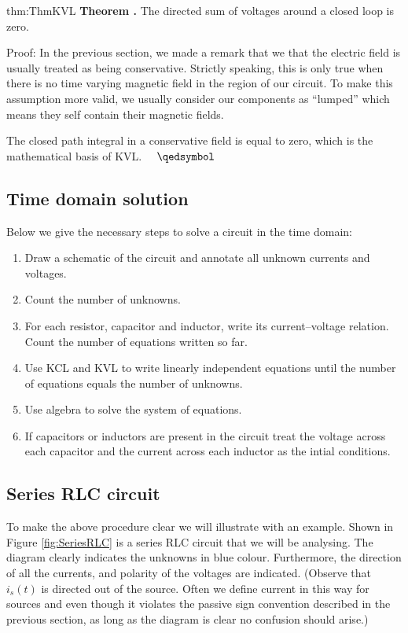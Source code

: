 \documentclass[14pt,a5paper,twoside]{book}
\newenvironment{myTheorem}[2]{ \begin{Theorem}[adjusted title=#1]{}{#2} 
  \textbf{Theorem \thetcbcounter.} \label{#2}}{\end{Theorem}}
\begin{document}
 
\begin{myTheorem}{Kirchhoff's Voltage Law (KVL)}{thm:ThmKVL}
	The directed sum of voltages around a closed loop is zero.
\end{myTheorem}
Proof: In the previous section, we made a remark that we that the electric field is usually treated as being conservative. Strictly speaking, this is only true when there is no time varying magnetic field in the region of our circuit. To make this assumption more valid, we usually consider our components as ``lumped''  which means they self contain their magnetic fields.

The closed path integral in a conservative field is equal to zero, which is the mathematical basis of KVL. $\quad\qedsymbol$

\newpage
\subsection{Time domain solution}
Below we give the necessary steps to solve a circuit in the time domain:
\begin{enumerate}
\item{Draw a schematic of the circuit and annotate all unknown currents and voltages.}
\item{Count the number of unknowns.}
\item{For each resistor, capacitor and inductor, write its current--voltage relation. Count the number of equations written so far.}
\item{Use KCL and KVL to write linearly independent equations until the number of equations equals the number of unknowns.}
\item{Use algebra to solve the system of equations.}
\item{If capacitors or inductors are present in the circuit treat the voltage across each capacitor and the current across each inductor as the intial conditions.}
\end{enumerate}

\subsection{Series RLC circuit}

To make the above procedure clear we will illustrate with an example. Shown in Figure \ref{fig:SeriesRLC} is a series RLC circuit that we will be analysing. The diagram clearly indicates the unknowns in blue colour. Furthermore, the direction of all the currents, and polarity of the voltages are indicated. (Observe that $i_s(t)$ is directed out of the source. Often we define current in this way for sources and even though it violates the passive sign convention described in the previous section, as long as the diagram is clear no confusion should arise.)
\end{document}
